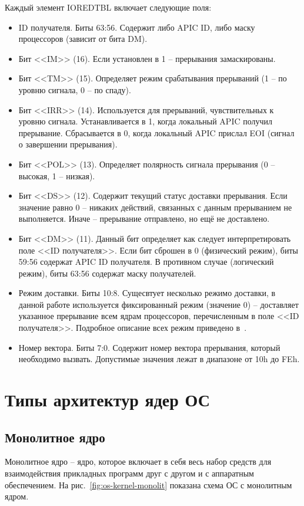 Каждый элемент IOREDTBL включает следующие поля:
\begin{itemize}
\item ID получателя. Биты 63:56. Содержит либо APIC ID, либо маску процессоров (зависит от бита DM).
\item Бит <<IM>> (16). Если установлен в 1 -- прерывания замаскированы.
\item Бит <<TM>> (15). Определяет режим срабатывания прерываний (1 -- по уровню сигнала, 0 -- по спаду).
\item Бит <<IRR>> (14). Используется для прерываний, чувствительных к уровню сигнала. Устанавливается в 1,
	когда локальный APIC получил прерывание. Сбрасывается в 0, когда локальный APIC прислал EOI (сигнал
	о завершении прерывания).
\item Бит <<POL>> (13). Определяет полярность сигнала прерывания (0 -- высокая, 1 -- низкая).
\item Бит <<DS>> (12). Содержит текущий статус доставки прерывания. Если значение равно 0 -- никаких действий,
	связанных с данным прерыванием не выполняется. Иначе -- прерывание отправлено, но ещё не доставлено.
\item Бит <<DM>> (11). Данный бит определяет как следует интерпретировать поле <<ID получателя>>.
	Если бит сброшен в 0 (физический режим), биты 59:56 содержат APIC ID получателя. В
	противном случае (логический режим), биты 63:56 содержат маску получателей.
\item Режим доставки. Биты 10:8. Сущесвтует несколько режимо доставки, в данной работе используется
	фиксированный режим (значение 0) -- доставляет указанное прерывание всем ядрам процессоров,
	перечисленным в поле <<ID получателя>>. Подробное описание всех режим приведено в~\cite{ioapic}.
\item Номер вектора. Биты 7:0. Содержит номер вектора прерывания, который необходимо вызвать.
	Допустимые значения лежат в диапазоне от 10h до FEh.
\end{itemize}



\section{Типы архитектур ядер ОС}
\subsection{Монолитное ядро}
Монолитное ядро -- ядро, которое включает в себя весь набор средств для
взаимодействия прикладных программ друг с другом и с аппаратным обеспечением.
На рис.~\ref{fig:os-kernel-monolit} показана схема ОС с монолитным ядром.

